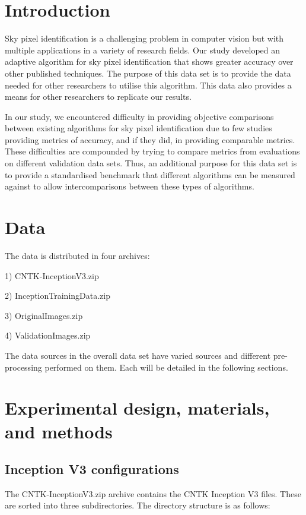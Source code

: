 \documentclass[final,3p,times,authoryear]{elsarticle}
\begin{document}
\section{Introduction}
\label{sec:introduction}
Sky pixel identification is a challenging problem in computer vision but with multiple applications in a variety of research fields. Our study \citep{Nice2019UC} developed an adaptive algorithm for sky pixel identification that shows greater accuracy over other published techniques. The purpose of this data set is to provide the data needed for other researchers to utilise this algorithm. This data also provides a means for other researchers to replicate our results.

In our study, we encountered difficulty in providing objective comparisons between existing algorithms for sky pixel identification due to few studies providing metrics of accuracy, and if they did, in providing comparable metrics. These difficulties are compounded by trying to compare metrics from evaluations on different validation data sets. Thus, an additional purpose for this data set is to provide a standardised benchmark that different algorithms can be measured against to allow intercomparisons between these types of algorithms.




\section{Data}

The data is distributed in four archives: 

1) CNTK-InceptionV3.zip

2) InceptionTrainingData.zip

3) OriginalImages.zip

4) ValidationImages.zip

The data sources in the overall data set have varied sources and different pre-processing performed on them. Each will be detailed in the following sections.

\section{Experimental design, materials, and methods}
\label{sec:create}

\subsection{Inception V3 configurations}\label{sec:configuations}
The CNTK-InceptionV3.zip archive contains the CNTK Inception V3 files. These are sorted into three subdirectories. The directory structure is as follows:
\end{document}
